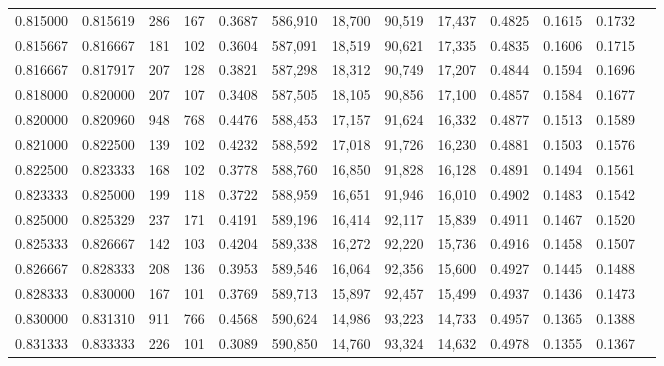 \begin{tabular}{rrrrrrrrrrrrr}
0.815000 & 0.815619 &   286 & 167 &                                     0.3687 & 586,910 &  18,700 &  90,519 &  17,437 & 0.4825 & 0.1615 & 0.1732 \\
0.815667 & 0.816667 &   181 & 102 &                                     0.3604 & 587,091 &  18,519 &  90,621 &  17,335 & 0.4835 & 0.1606 & 0.1715 \\
0.816667 & 0.817917 &   207 & 128 &                                     0.3821 & 587,298 &  18,312 &  90,749 &  17,207 & 0.4844 & 0.1594 & 0.1696 \\
0.818000 & 0.820000 &   207 & 107 &                                     0.3408 & 587,505 &  18,105 &  90,856 &  17,100 & 0.4857 & 0.1584 & 0.1677 \\
0.820000 & 0.820960 &   948 & 768 &                                     0.4476 & 588,453 &  17,157 &  91,624 &  16,332 & 0.4877 & 0.1513 & 0.1589 \\
0.821000 & 0.822500 &   139 & 102 &                                     0.4232 & 588,592 &  17,018 &  91,726 &  16,230 & 0.4881 & 0.1503 & 0.1576 \\
0.822500 & 0.823333 &   168 & 102 &                                     0.3778 & 588,760 &  16,850 &  91,828 &  16,128 & 0.4891 & 0.1494 & 0.1561 \\
0.823333 & 0.825000 &   199 & 118 &                                     0.3722 & 588,959 &  16,651 &  91,946 &  16,010 & 0.4902 & 0.1483 & 0.1542 \\
0.825000 & 0.825329 &   237 & 171 &                                     0.4191 & 589,196 &  16,414 &  92,117 &  15,839 & 0.4911 & 0.1467 & 0.1520 \\
0.825333 & 0.826667 &   142 & 103 &                                     0.4204 & 589,338 &  16,272 &  92,220 &  15,736 & 0.4916 & 0.1458 & 0.1507 \\
0.826667 & 0.828333 &   208 & 136 &                                     0.3953 & 589,546 &  16,064 &  92,356 &  15,600 & 0.4927 & 0.1445 & 0.1488 \\
0.828333 & 0.830000 &   167 & 101 &                                     0.3769 & 589,713 &  15,897 &  92,457 &  15,499 & 0.4937 & 0.1436 & 0.1473 \\
0.830000 & 0.831310 &   911 & 766 &                                     0.4568 & 590,624 &  14,986 &  93,223 &  14,733 & 0.4957 & 0.1365 & 0.1388 \\
0.831333 & 0.833333 &   226 & 101 &                                     0.3089 & 590,850 &  14,760 &  93,324 &  14,632 & 0.4978 & 0.1355 & 0.1367 \\

\end{tabular}
